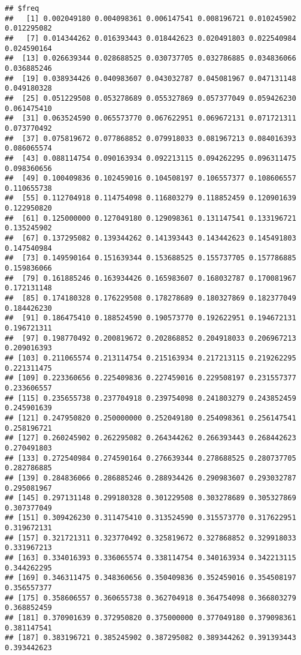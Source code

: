 \documentclass[
]{article}
\begin{document}
\begin{verbatim}
## $freq
##   [1] 0.002049180 0.004098361 0.006147541 0.008196721 0.010245902 0.012295082
##   [7] 0.014344262 0.016393443 0.018442623 0.020491803 0.022540984 0.024590164
##  [13] 0.026639344 0.028688525 0.030737705 0.032786885 0.034836066 0.036885246
##  [19] 0.038934426 0.040983607 0.043032787 0.045081967 0.047131148 0.049180328
##  [25] 0.051229508 0.053278689 0.055327869 0.057377049 0.059426230 0.061475410
##  [31] 0.063524590 0.065573770 0.067622951 0.069672131 0.071721311 0.073770492
##  [37] 0.075819672 0.077868852 0.079918033 0.081967213 0.084016393 0.086065574
##  [43] 0.088114754 0.090163934 0.092213115 0.094262295 0.096311475 0.098360656
##  [49] 0.100409836 0.102459016 0.104508197 0.106557377 0.108606557 0.110655738
##  [55] 0.112704918 0.114754098 0.116803279 0.118852459 0.120901639 0.122950820
##  [61] 0.125000000 0.127049180 0.129098361 0.131147541 0.133196721 0.135245902
##  [67] 0.137295082 0.139344262 0.141393443 0.143442623 0.145491803 0.147540984
##  [73] 0.149590164 0.151639344 0.153688525 0.155737705 0.157786885 0.159836066
##  [79] 0.161885246 0.163934426 0.165983607 0.168032787 0.170081967 0.172131148
##  [85] 0.174180328 0.176229508 0.178278689 0.180327869 0.182377049 0.184426230
##  [91] 0.186475410 0.188524590 0.190573770 0.192622951 0.194672131 0.196721311
##  [97] 0.198770492 0.200819672 0.202868852 0.204918033 0.206967213 0.209016393
## [103] 0.211065574 0.213114754 0.215163934 0.217213115 0.219262295 0.221311475
## [109] 0.223360656 0.225409836 0.227459016 0.229508197 0.231557377 0.233606557
## [115] 0.235655738 0.237704918 0.239754098 0.241803279 0.243852459 0.245901639
## [121] 0.247950820 0.250000000 0.252049180 0.254098361 0.256147541 0.258196721
## [127] 0.260245902 0.262295082 0.264344262 0.266393443 0.268442623 0.270491803
## [133] 0.272540984 0.274590164 0.276639344 0.278688525 0.280737705 0.282786885
## [139] 0.284836066 0.286885246 0.288934426 0.290983607 0.293032787 0.295081967
## [145] 0.297131148 0.299180328 0.301229508 0.303278689 0.305327869 0.307377049
## [151] 0.309426230 0.311475410 0.313524590 0.315573770 0.317622951 0.319672131
## [157] 0.321721311 0.323770492 0.325819672 0.327868852 0.329918033 0.331967213
## [163] 0.334016393 0.336065574 0.338114754 0.340163934 0.342213115 0.344262295
## [169] 0.346311475 0.348360656 0.350409836 0.352459016 0.354508197 0.356557377
## [175] 0.358606557 0.360655738 0.362704918 0.364754098 0.366803279 0.368852459
## [181] 0.370901639 0.372950820 0.375000000 0.377049180 0.379098361 0.381147541
## [187] 0.383196721 0.385245902 0.387295082 0.389344262 0.391393443 0.393442623

\end{verbatim}
\end{document}
